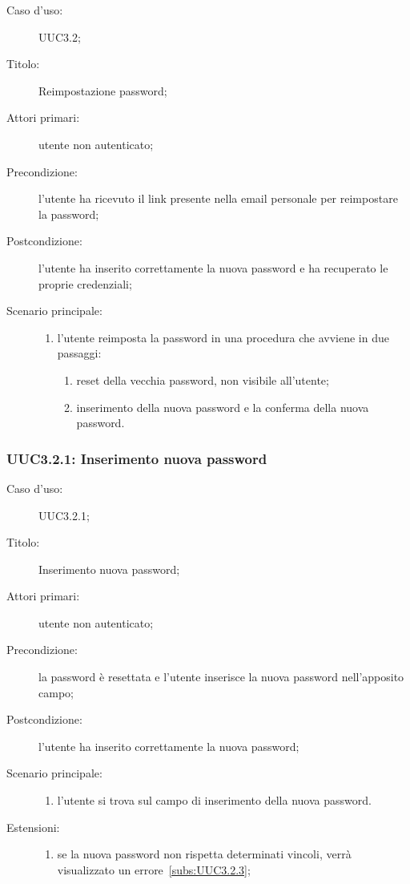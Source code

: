 \documentclass[../../../analisi-dei-requisiti.tex]{subfiles}
\begin{document}
\begin{description}
  \item[Caso d'uso:] UUC3.2;
  \item[Titolo:] Reimpostazione password;
  \item[Attori primari:] utente non autenticato;
  \item[Precondizione:] l'utente ha ricevuto il link presente nella email personale per reimpostare la password;
  \item[Postcondizione:] l'utente ha inserito correttamente la nuova password e ha recuperato le proprie credenziali;
  \item[Scenario principale:]
        \begin{enumerate}
          \item l'utente reimposta la password in una procedura che avviene in due passaggi:
                \begin{enumerate}
                  \item reset della vecchia password, non visibile all'utente;
                  \item inserimento della nuova password e la conferma della nuova password.
                \end{enumerate}
        \end{enumerate}
\end{description}

\subsubsection{UUC3.2.1: Inserimento nuova password}%
\label{subs:UUC3.2.1}
\begin{description}
  \item[Caso d'uso:] UUC3.2.1;
  \item[Titolo:] Inserimento nuova password;
  \item[Attori primari:] utente non autenticato;
  \item[Precondizione:] la password è resettata e l'utente inserisce la nuova password nell'apposito campo;
  \item[Postcondizione:] l'utente ha inserito correttamente la nuova password;
  \item[Scenario principale:]
        \begin{enumerate}
          \item l'utente si trova sul campo di inserimento della nuova password.
        \end{enumerate}
  \item[Estensioni:]
        \begin{enumerate}
          \item se la nuova password non rispetta determinati vincoli, verrà visualizzato un errore~\ref{subs:UUC3.2.3};
        \end{enumerate}
\end{description}
\end{document}
